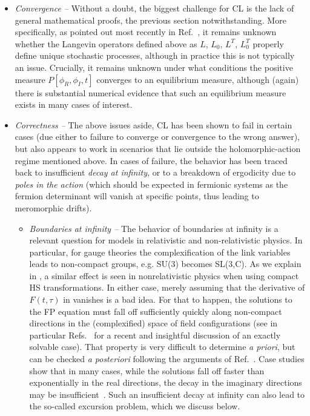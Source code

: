\documentclass[../main.tex]{subfiles}
\begin{document}
\begin{itemize}
\item {\it Convergence --} Without a doubt, the biggest challenge for CL is the lack of general mathematical proofs, the previous section notwithstanding.
More specifically, as pointed out most recently in Ref.~\cite{Seiler2017StatusOfCL}, it remains unknown whether the Langevin operators defined
above as $L$, $L_0$, $L^T$, $L_0^T$ properly define unique stochastic processes, although in practice this is not typically an issue.
Crucially, it remains unknown under what conditions the positive measure
$P[\phi_{R}, \phi_{I},t]$ converges to an equilibrium measure, although (again) there is substantial numerical evidence that such an equilibrium
measure exists in many cases of interest.

\item {\it Correctness --} The above issues aside, CL has been shown to fail in certain cases (due either to failure to converge or convergence to the wrong answer),
but also appears to work in scenarios that lie outside the holomorphic-action regime mentioned above.
In cases of failure, the behavior has been traced back to insufficient {\it decay at infinity},
or to a breakdown of ergodicity due to {\it poles in the action} (which should be expected in fermionic
systems as the fermion determinant will vanish at specific points, thus leading to meromorphic drifts).

\begin{itemize}
\item {\it Boundaries at infinity --} The behavior of boundaries at infinity is a relevant question for models in relativistic and non-relativistic physics.
In particular, for gauge theories the complexification of the link variables leads to non-compact groups, e.g. SU(3) becomes SL(3,C).
As we explain in , a similar effect is seen in nonrelativistic physics when using compact HS transformations.
In either case, merely assuming that the derivative of $F(t,\tau)$ in  vanishes is a bad idea. For that to happen,
the solutions to the FP equation must fall off sufficiently quickly along non-compact directions in the (complexified) space of field
configurations (see in particular Refs.~\cite{PRDSalcedoCL2016, PhysRevD.99.014512} for a recent and insightful discussion of an
exactly solvable case). That property is very difficult to determine {\it a priori}, but can be checked {\it a posteriori} following the arguments of
Ref.~\cite{CLJustificationPRD94114515}. Case studies show
that in many cases, while the solutions fall off faster than exponentially in the real directions, the decay in the imaginary directions may be
insufficient~\cite{AartsPRD81054508}. Such an insufficient decay at infinity can also lead to the so-called excursion problem, which we
discuss below.


\end{itemize}
\end{itemize}
\end{document}
